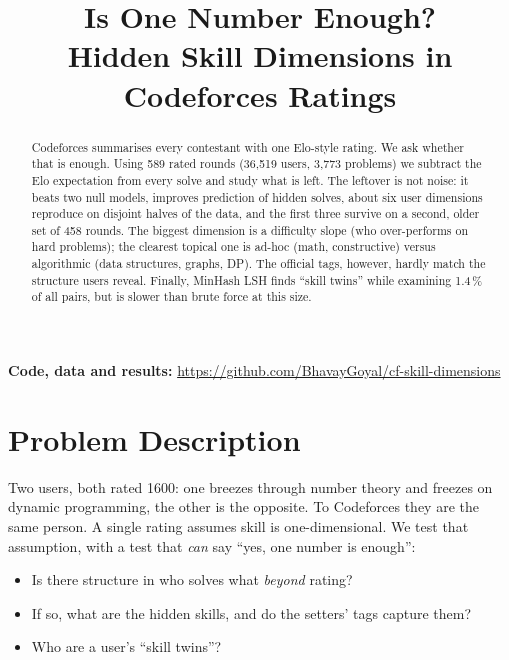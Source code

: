 \documentclass[conference]{IEEEtran}
\newcommand{\repourl}{https://github.com/BhavayGoyal/cf-skill-dimensions}
\begin{document}
\title{Is One Number Enough?\\Hidden Skill Dimensions in Codeforces Ratings}

\author{
\and
{}}

\maketitle

\begin{abstract}
Codeforces summarises every contestant with one Elo-style rating. We ask whether that is enough. Using 589 rated rounds (36,519 users, 3,773 problems) we subtract the Elo expectation from every solve and study what is left. The leftover is not noise: it beats two null models, improves prediction of hidden solves, about six user dimensions reproduce on disjoint halves of the data, and the first three survive on a second, older set of 458 rounds. The biggest dimension is a difficulty slope (who over-performs on hard problems); the clearest topical one is ad-hoc (math, constructive) versus algorithmic (data structures, graphs, DP). The official tags, however, hardly match the structure users reveal. Finally, MinHash LSH finds ``skill twins'' while examining 1.4\,\% of all pairs, but is slower than brute force at this size.
\end{abstract}

\noindent\textbf{Code, data and results:} \url{\repourl}\par

\section{Problem Description}
Two users, both rated 1600: one breezes through number theory and freezes on dynamic programming, the other is the opposite. To Codeforces they are the same person. A single rating assumes skill is one-dimensional. We test that assumption, with a test that \emph{can} say ``yes, one number is enough'':
\begin{itemize}
\item Is there structure in who solves what \emph{beyond} rating?
\item If so, what are the hidden skills, and do the setters' tags capture them?
\item Who are a user's ``skill twins''?
\end{itemize}
\end{document}
